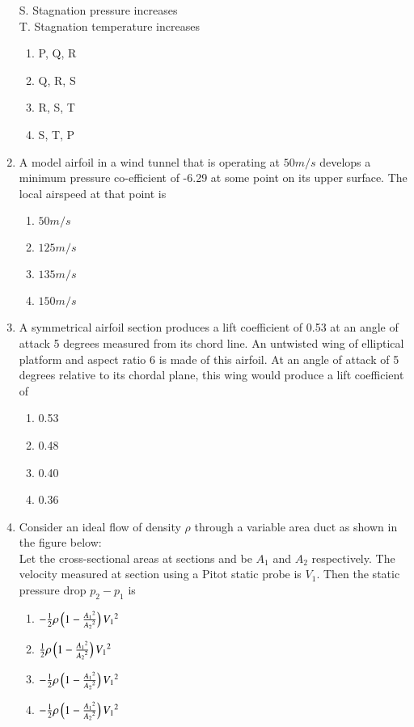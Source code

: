 \documentclass[journal]{IEEEtran}
\begin{document}
\begin{enumerate}
	S.	Stagnation pressure increases \\
	T.	Stagnation temperature increases
		\begin{enumerate}
			\item P, Q, R
			\item Q, R, S
			\item R, S, T
			\item S, T, P
		\end{enumerate}
	\item
	A model airfoil in a wind tunnel that is operating at $50 m/s$ develops a minimum pressure co-efficient of -6.29 at some point on its upper surface. The local airspeed at that point is 
		\begin{enumerate}
			\item $50 m/s$
			\item $125 m/s$
			\item $135 m/s$
			\item $150 m/s$
		\end{enumerate}
	\item
	A symmetrical airfoil section produces a lift coefficient of 0.53 at an angle of attack 5 degrees measured from its chord line. An untwisted wing of elliptical platform and aspect ratio 6 is made of this airfoil. At an angle of attack of 5 degrees relative to its chordal plane, this wing would produce a lift coefficient of
		\begin{enumerate}
			\item 0.53
			\item 0.48
			\item 0.40
			\item 0.36
		\end{enumerate}
	\item
	Consider an ideal flow of density $\rho$ through a variable area duct as shown in the figure below:  \\
	
	
	
	Let the cross-sectional areas at sections  and  be $A_1$ and $A_2$ respectively. The velocity measured at section  using a Pitot static probe is $V_1$. Then the static pressure drop $p_2 - p_1$ is
		\begin{figure}[h!]
    			\centering
    			
    			\caption{}
    			\label{36}
		\end{figure}

		\begin{enumerate}
			\item $-\frac{1}{2}\rho\left(1-\frac{{A_{1}}^{2}}{{A_{2}}^{2}}\right){V_1}^{2}$
			\item $\frac{1}{2}\rho\left(1-\frac{{A_{1}}^{2}}{{A_{2}}^{2}}\right){V_1}^{2}$
			\item $-\frac{1}{2}\rho\left(1-\frac{{A_{1}}^{2}}{{A_{2}}^{2}}\right){V_1}^{2}$
			\item $-\frac{1}{2}\rho\left(1-\frac{{A_{1}}^{2}}{{A_{2}}^{2}}\right){V_1}^{2}$
		\end{enumerate}
	
			
			
			
			
			
\end{enumerate}
\end{document}

